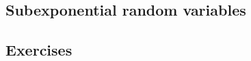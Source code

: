 \subsection{Subexponential random variables}

\begin{theorem}
    
\end{theorem}

\begin{theorem}
    
\end{theorem}


\subsection*{Exercises}

